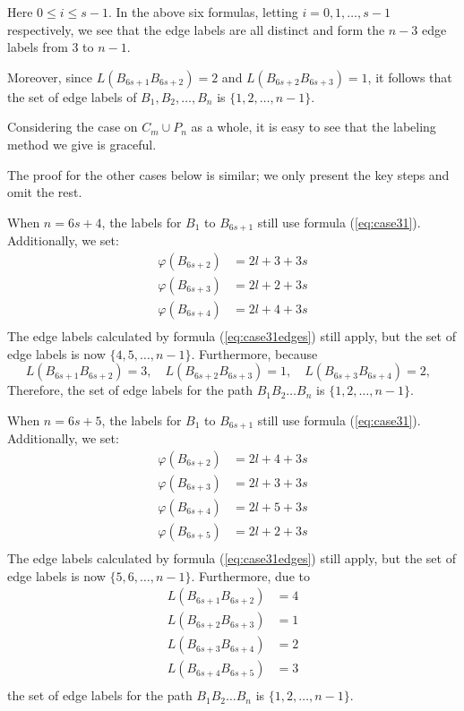 \documentclass[fleqn,svgnames,screen,acmsmall]{ml2rcn}
\begin{document}
\begin{description}
Here $0 \leq i \leq s-1$. In the above six formulas, letting $i=0,1,\ldots,s-1$ respectively, we see that the edge labels are all distinct and form the $n-3$ edge labels from $3$ to $n-1$.

Moreover, since 
$L(B_{6s+1} B_{6s+2})=2$ and $L(B_{6s+2} B_{6s+3})=1$, it follows that the set of edge labels of $B_1,B_2,\ldots,B_n$ is $\{1,2,\ldots,n-1\}$.

Considering the case on $C_m \cup P_n$ as a whole, it is easy to see that the labeling method we give is graceful.

The proof for the other cases below is similar; we only present the key steps and omit the rest.

\vspace{0.5\baselineskip}

\item[Case (3-2)]
 When $n=6s+4$, the labels for $B_{1}$ to $B_{6s+1}$ still use formula (\ref{eq:case31}). 
 Additionally, we set:
\[
\begin{aligned}
\varphi(B_{6s+2}) &= 2l+3+3s \\
\varphi(B_{6s+3}) &= 2l+2+3s \\
\varphi(B_{6s+4}) &= 2l+4+3s \\
\end{aligned}
\]
The edge labels calculated by formula (\ref{eq:case31edges}) still apply, but the set of edge labels is now $\{4, 5, \ldots, n-1\}$. Furthermore, because
\[
L(B_{6s+1}B_{6s+2}) = 3, \quad L(B_{6s+2}B_{6s+3}) = 1, \quad L(B_{6s+3}B_{6s+4}) = 2, \text{ }
\]
Therefore, the set of edge labels for the path $B_{1}B_{2}\ldots B_{n}$ is $\{1, 2, \ldots, n-1\}$.

\vspace{0.5\baselineskip}

\item[Case (3-3)] 
When $n=6s+5$, the labels for $B_{1}$ to $B_{6s+1}$ still use formula (\ref{eq:case31}). Additionally, we set:
\[
\begin{aligned}
\varphi(B_{6s+2}) &= 2l+4+3s \\  
\varphi(B_{6s+3}) &= 2l+3+3s \\  
\varphi(B_{6s+4}) &= 2l+5+3s \\
\varphi(B_{6s+5}) &= 2l+2+3s \\ 
\end{aligned}
\]
The edge labels calculated by formula (\ref{eq:case31edges}) still apply, but the set of edge labels is now $\{5, 6, \ldots, n-1\}$. Furthermore, due to
\[
\begin{aligned}
L(B_{6s+1}B_{6s+2}) &= 4 \\
L(B_{6s+2}B_{6s+3}) &= 1 \\
L(B_{6s+3}B_{6s+4}) &= 2 \\
L(B_{6s+4}B_{6s+5}) &= 3 \\
\end{aligned}
\]
the set of edge labels for the path $B_{1}B_{2}\ldots B_{n}$ is $\{1, 2, \ldots, n-1\}$.


\end{description}
\end{document}
